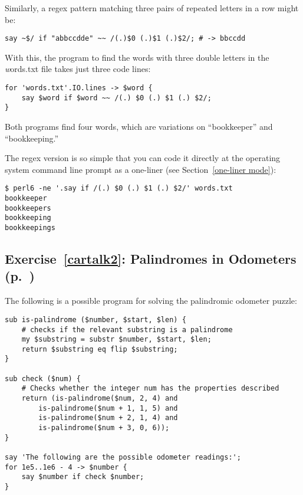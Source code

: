 Similarly, a regex pattern matching three pairs of repeated 
letters in a row might be:
\begin{verbatim}
say ~$/ if "abbccdde" ~~ /(.)$0 (.)$1 (.)$2/; # -> bbccdd 
\end{verbatim}

With this, the program to find the words with three double 
letters in the {\emph words.txt} file takes just three code 
lines:

\begin{verbatim}
for 'words.txt'.IO.lines -> $word {
    say $word if $word ~~ /(.) $0 (.) $1 (.) $2/;
}
\end{verbatim}
%

Both programs find four words, which are variations on 
``bookkeeper'' and ``bookkeeping.''

The regex version is so simple that you can code it directly 
at the operating system command line prompt as a one-liner 
(see Section~\ref{one-liner mode}):

\begin{verbatim}
$ perl6 -ne '.say if /(.) $0 (.) $1 (.) $2/' words.txt
bookkeeper
bookkeepers
bookkeeping
bookkeepings
\end{verbatim}

\subsection{Exercise~\ref{cartalk2}: Palindromes in Odometers (p.~\pageref{cartalk2})}
\label{sol_cartalk2}

The following is a possible program for solving the 
palindromic odometer puzzle:

\begin{verbatim}
sub is-palindrome ($number, $start, $len) {
    # checks if the relevant substring is a palindrome
    my $substring = substr $number, $start, $len;
    return $substring eq flip $substring;
}
    
sub check ($num) {
    # Checks whether the integer num has the properties described
    return (is-palindrome($num, 2, 4) and
        is-palindrome($num + 1, 1, 5) and
        is-palindrome($num + 2, 1, 4) and
        is-palindrome($num + 3, 0, 6));
}

say 'The following are the possible odometer readings:';
for 1e5..1e6 - 4 -> $number {
    say $number if check $number;
}
\end{verbatim}

